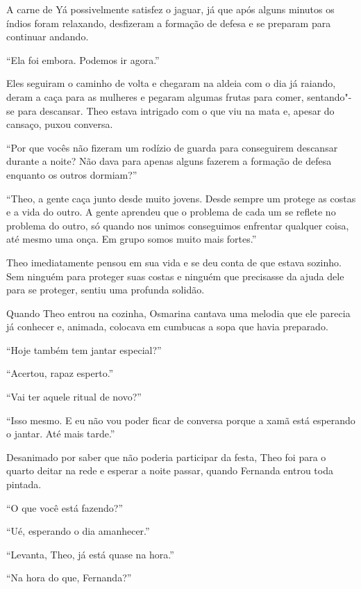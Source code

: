 A carne de Yá possivelmente satisfez o jaguar, já que após alguns
minutos os índios foram relaxando, desfizeram a formação de defesa e se
preparam para continuar andando.

``Ela foi embora. Podemos ir agora.''

Eles seguiram o caminho de volta e chegaram na aldeia com o dia já
raiando, deram a caça para as mulheres e pegaram algumas frutas para
comer, sentando"-se para descansar. Theo estava intrigado com o que viu
na mata e, apesar do cansaço, puxou conversa.

``Por que vocês não fizeram um rodízio de guarda para conseguirem
descansar durante a noite? Não dava para apenas alguns fazerem a
formação de defesa enquanto os outros dormiam?''

``Theo, a gente caça junto desde muito jovens. Desde sempre um protege
as costas e a vida do outro. A gente aprendeu que o problema de cada um
se reflete no problema do outro, só quando nos unimos conseguimos
enfrentar qualquer coisa, até mesmo uma onça. Em grupo somos muito mais
fortes.''

Theo imediatamente pensou em sua vida e se deu conta de que estava
sozinho. Sem ninguém para proteger suas costas e ninguém que precisasse
da ajuda dele para se proteger, sentiu uma profunda solidão.

\asterisc


Quando Theo entrou na cozinha, Osmarina cantava uma melodia que ele
parecia já conhecer e, animada, colocava em cumbucas a sopa que havia
preparado.

``Hoje também tem jantar especial?''

``Acertou, rapaz esperto.''

``Vai ter aquele ritual de novo?''

``Isso mesmo. E eu não vou poder ficar de conversa porque a xamã está
esperando o jantar. Até mais tarde.''

Desanimado por saber que não poderia participar da festa, Theo foi para
o quarto deitar na rede e esperar a noite passar, quando Fernanda entrou
toda pintada.

``O que você está fazendo?''

``Ué, esperando o dia amanhecer.''

``Levanta, Theo, já está quase na hora.''

``Na hora do que, Fernanda?''

